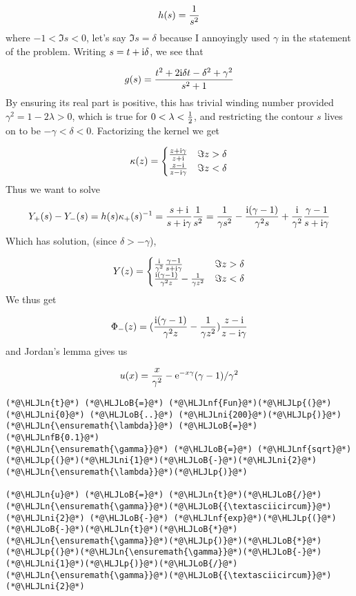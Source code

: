 \documentclass[12pt,landscape]{article}
\newcommand{\HLJLn}[1]{#1}
\newcommand{\HLJLnf}[1]{\textcolor[RGB]{66,102,213}{#1}}
\newcommand{\HLJLnfB}[1]{\textcolor[RGB]{59,151,46}{#1}}
\newcommand{\HLJLni}[1]{\textcolor[RGB]{59,151,46}{#1}}
\newcommand{\HLJLoB}[1]{\textcolor[RGB]{102,102,102}{\textbf{#1}}}
\newcommand{\HLJLp}[1]{#1}
\def\I{ {\rm i} }
\def\E{ {\rm e} }
\begin{document}
{\[
h(s) = {1 \over s^2}
\]
where $-1 < \Im s  < 0$, let's say $\Im s  = \delta$ because I annoyingly used $\gamma$ in the statement of the problem. Writing $s = t + \I \delta$, we see that

\[
g(s) =  {t^2 +2 \I \delta t -\delta^2 +\gamma^2 \over s^2 + 1}
\]
By ensuring its real part is positive, this has trivial winding number provided $\gamma^2 = 1 - 2\lambda > 0$, which is true for $0 < \lambda < {1 \over 2}$, and restricting the contour $s$ lives on to be $- {\gamma} < \delta < 0$. Factorizing the kernel we get

\[
\kappa(z) = \begin{cases}
    {z+\I  \gamma \over z + \I} & \Im z > \delta\\
    {z-\I  \over z-\I  \gamma} & \Im z < \delta
    \end{cases}
\]
Thus we want to solve

\[
Y_+(s) - Y_-(s) = h(s) \kappa_+(s)^{-1} = {s + \I \over s + \I  \gamma} { 1 \over s^2} = {1 \over \gamma s^2} - {\I ( \gamma - 1) \over \gamma^2 s} + {\I \over \gamma^2 }{  \gamma - 1 \over s+ \I  \gamma}
\]
Which has solution, (since $\delta > - \gamma$),

\[
Y(z) = \begin{cases}
   {\I \over \gamma^2 }{  \gamma - 1 \over s+ \I \gamma} & \Im z > \delta\\
 {\I ( \gamma - 1) \over \gamma^2 z} - {1 \over \gamma z^2} & \Im z < \delta
    \end{cases}
\]
We thus get

\[
\Phi_-(z) = ({\I ( \gamma - 1) \over \gamma^2 z} - {1 \over \gamma z^2})     {z-\I  \over z-\I  \gamma}
\]
and Jordan's lemma gives us

\[
u(x) = {x \over \gamma^2} - \E^{-x \gamma}(\gamma-1)/\gamma^2
\]

\begin{lstlisting}
(*@\HLJLn{t}@*) (*@\HLJLoB{=}@*) (*@\HLJLnf{Fun}@*)(*@\HLJLp{(}@*)(*@\HLJLni{0}@*) (*@\HLJLoB{..}@*) (*@\HLJLni{200}@*)(*@\HLJLp{)}@*)
(*@\HLJLn{\ensuremath{\lambda}}@*) (*@\HLJLoB{=}@*) (*@\HLJLnfB{0.1}@*)
(*@\HLJLn{\ensuremath{\gamma}}@*) (*@\HLJLoB{=}@*) (*@\HLJLnf{sqrt}@*)(*@\HLJLp{(}@*)(*@\HLJLni{1}@*)(*@\HLJLoB{-}@*)(*@\HLJLni{2}@*)(*@\HLJLn{\ensuremath{\lambda}}@*)(*@\HLJLp{)}@*)

(*@\HLJLn{u}@*) (*@\HLJLoB{=}@*) (*@\HLJLn{t}@*)(*@\HLJLoB{/}@*)(*@\HLJLn{\ensuremath{\gamma}}@*)(*@\HLJLoB{{\textasciicircum}}@*)(*@\HLJLni{2}@*) (*@\HLJLoB{-}@*) (*@\HLJLnf{exp}@*)(*@\HLJLp{(}@*)(*@\HLJLoB{-}@*)(*@\HLJLn{t}@*)(*@\HLJLoB{*}@*)(*@\HLJLn{\ensuremath{\gamma}}@*)(*@\HLJLp{)}@*)(*@\HLJLoB{*}@*)(*@\HLJLp{(}@*)(*@\HLJLn{\ensuremath{\gamma}}@*)(*@\HLJLoB{-}@*)(*@\HLJLni{1}@*)(*@\HLJLp{)}@*)(*@\HLJLoB{/}@*)(*@\HLJLn{\ensuremath{\gamma}}@*)(*@\HLJLoB{{\textasciicircum}}@*)(*@\HLJLni{2}@*)


\end{lstlisting}}
\end{document}
